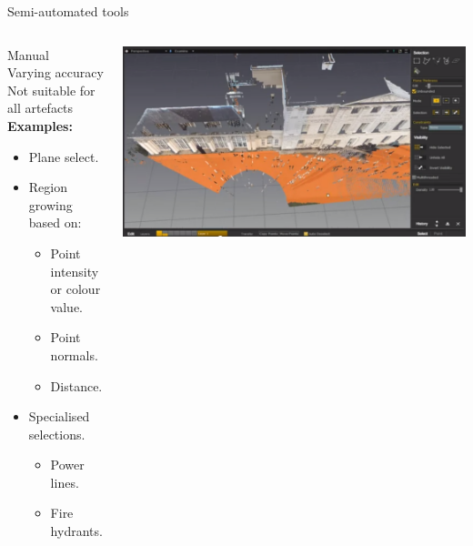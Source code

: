 \documentclass{beamer}
\begin{document}
\begin{frame}{Semi-automated tools}


\begin{columns}[T]
\begin{column}{0.5\textwidth}

Manual\\
Varying accuracy\\
Not suitable for all artefacts\\
\textbf{Examples:}
\begin{itemize}
\item Plane select.
\item Region growing based on:

\begin{itemize}
\item Point intensity or colour value.
\item Point normals.
\item Distance.
\end{itemize}

\item Specialised selections.
\begin{itemize}
\item Power lines.
\item Fire hydrants.
\end{itemize}
\end{itemize}

\end{column}
\begin{column}{0.5\textwidth}
\includegraphics[width=1\textwidth]{pics/plane.png}
\end{column}

\end{columns}

\end{frame}
\end{document}
